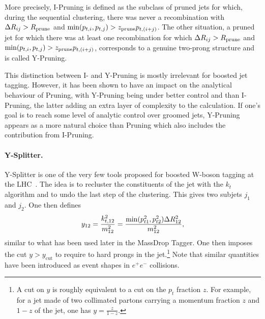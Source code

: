 More precisely, I-Pruning is defined as the
subclass of pruned jets for which, during the sequential clustering,
there was never a recombination with $\Delta R_{ij}>R_{\rm prune}$ and
${\rm min}(p_{t,i},p_{t,j})> z_{\rm prune}p_{t,(i+j)}$.
%
The other situation, \ie a pruned jet for which there was at least one
recombination for which $\Delta R_{ij}>R_{\rm prune}$ and
${\rm min}(p_{t,i},p_{t,j})> z_{\rm prune}p_{t,(i+j)}$, corresponds to
a genuine two-prong structure and is called Y-Pruning.

This distinction between I- and Y-Pruning is mostly irrelevant for
boosted jet tagging. However, it has been shown to have an impact on
the analytical behaviour of Pruning, with Y-Pruning being under better
control and than I-Pruning, the latter adding an extra layer of
complexity to the calculation. If one's goal is to reach some level of
analytic control over groomed jets, Y-Pruning appears as a more
natural choice than Pruning which also includes the contribution from
I-Pruning.

\paragraph{Y-Splitter.} Y-Splitter is one of the very few tools
proposed for boosted W-boson tagging at the
LHC~\cite{Butterworth:2002tt}.
%
The idea is to recluster the constituents of the jet with the $k_t$
algorithm and to undo the last step of the clustering. This gives two
subjets $j_1$ and $j_2$. One then defines
\begin{equation}
y_{12} = \frac{k_{t,12}^2}{m_{12}^2} = \frac{{\rm
    min}(p_{t1}^2,p_{t2}^2)\Delta R_{12}^2}{m_{12}^2},
\end{equation}
similar to what has been used later in the MassDrop Tagger. One then
imposes the cut $y>y_\text{cut}$ to require to hard prongs in the
jet.\footnote{A cut on $y$ is roughly equivalent to a cut on the $p_t$
  fraction $z$. For example, for a jet made of two collimated partons
  carrying a momentum fraction $z$ and $1-z$ of the jet, one has
  $y=\tfrac{z}{1-z}$.}
Note that similar quantities have been introduced as event shapes in
$e^+e^-$ collisions.

